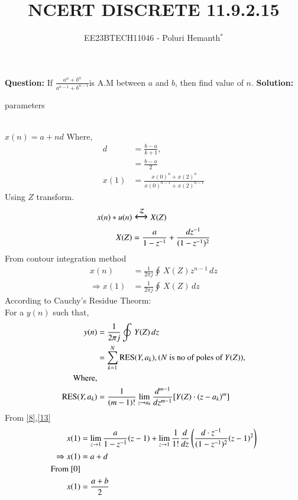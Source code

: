 \documentclass[journal,12pt,twocolumn]{IEEEtran}
\theoremstyle{remark}
\begin{document}

\vspace{3cm}


\title{NCERT DISCRETE 11.9.2.15}
\author{EE23BTECH11046 - Poluri Hemanth$^{*}$}
\maketitle
\textbf{Question:}
If \( \frac{a^n +b^n}{a^{n-1} + b^{n-1}}\)is A.M between $a$ and $b$, then find value of $n$.
\break
\textbf{Solution:}
\begin{table}[h!]
        
        \caption{parameters}
\end{table}
\\$x(n)=a+nd$    Where,
\begin{align}
	d&=\frac{b-a}{k+1},\\
	 &=\frac{b-a}{2}\label{0}\\
	x(1)&=\frac{x(0)^n +x(2)^n}{x(0)^{n-1} + x(2)^{n-1}}\label{r} 
\end{align}
Using $Z$ transform.
\begin{align}
	x(n)*u(n)&\Large\xleftrightarrow{\mathcal{Z}}X(Z)\\
	X(Z)&=\frac{a}{1-z^{-1}}+\frac{dz^{-1}}{(1-z^{-1})^2}\label{8}\\
\end{align}
From contour integration method
\begin{align}
	x(n)&=\frac{1}{2\pi j}\oint\,X(Z)z^{n-1}\,dz\\
	\Rightarrow x(1)&=\frac{1}{2\pi j}\oint\,X(Z)\,dz
\end{align}
According to Cauchy's Residue Theorm:\\
For a $y(n)$ such that, \\
\begin{align}
	y(n)&=\frac{1}{2\pi j}\oint\,Y(Z)\,dz\\
	&=\sum\limits_{k=1}^N\text{RES}(Y,a_k),\text{($N$ is no of poles of $Y(Z)$)},\label{13}\\ 
	\notag\text{Where,}\\
	\text{RES}(Y,a_k)&=\frac{1}{(m-1)!}\lim_{z\to a_k}\frac{d^{m-1}}{dz^{m-1}}[Y(Z)\cdot(z-a_k)^{m}]
\end{align}
From \eqref{8},\eqref{13}
\begin{align}	
	x(1)&=\lim_{z\to1}\frac{a}{1-z^{-1}}(z-1)+\lim_{z\to1}\frac{1}{1!}\frac{d}{dz}\left(\frac{d\cdot z^{-1}}{(1-z^{-1})^2}(z-1)^2\right)\\
	\Rightarrow x(1)&=a+d\\
	\notag\text{From \eqref{0}}\\
	 x(1)&=\frac{a+b}{2}
\end{align}
\end{document}
